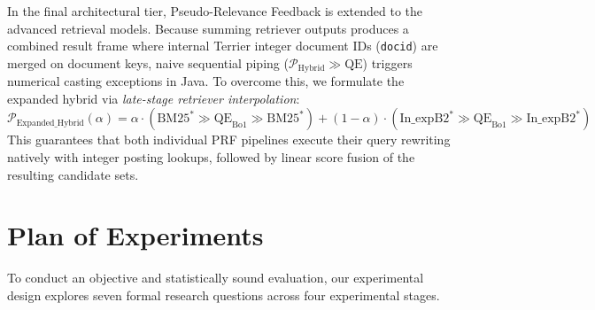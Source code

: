 \documentclass[10pt, a4paper]{article}
\begin{document}
In the final architectural tier, Pseudo-Relevance Feedback is extended to the advanced retrieval models. Because summing retriever outputs produces a combined result frame where internal Terrier integer document IDs (\texttt{docid}) are merged on document keys, naive sequential piping ($\mathcal{P}_{\text{Hybrid}} \gg \text{QE}$) triggers numerical casting exceptions in Java. To overcome this, we formulate the expanded hybrid via \textit{late-stage retriever interpolation}:
\begin{equation}
\mathcal{P}_{\text{Expanded\_Hybrid}}(\alpha) = \alpha \cdot \left( \text{BM25}^* \gg \text{QE}_{\text{Bo1}} \gg \text{BM25}^* \right) + (1 - \alpha) \cdot \left( \text{In\_expB2}^* \gg \text{QE}_{\text{Bo1}} \gg \text{In\_expB2}^* \right)
\end{equation}
This guarantees that both individual PRF pipelines execute their query rewriting natively with integer posting lookups, followed by linear score fusion of the resulting candidate sets.

\section{Plan of Experiments}
\label{sec:plan_of_experiments}

To conduct an objective and statistically sound evaluation, our experimental design explores seven formal research questions across four experimental stages.
\end{document}
